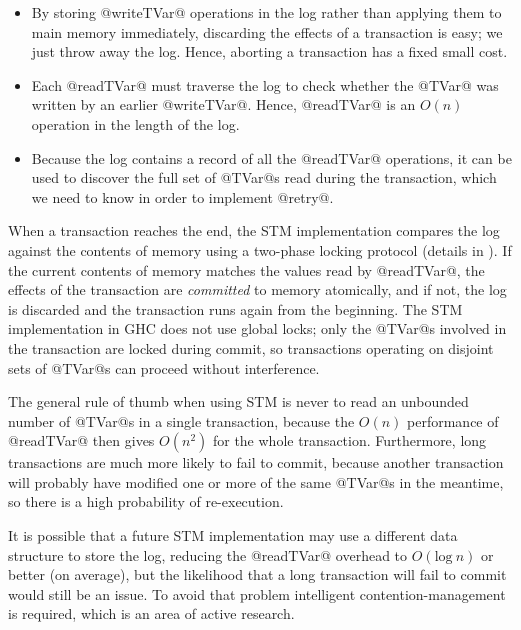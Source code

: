 \begin{itemize}
\item By storing @writeTVar@ operations in the log rather than
  applying them to main memory immediately, discarding the effects of
  a transaction is easy; we just throw away the log.  Hence, aborting
  a transaction has a fixed small cost.

\item Each @readTVar@ must traverse the log to check whether the
  @TVar@ was written by an earlier @writeTVar@.  Hence, @readTVar@ is
  an $O(n)$ operation in the length of the log.

\item Because the log contains a record of all the @readTVar@
  operations, it can be used to discover the full set of @TVar@s read
  during the transaction, which we need to know in order to implement
  @retry@.
\end{itemize}

When a transaction reaches the end, the STM implementation compares
the log against the contents of memory using a two-phase locking
protocol (details in \citet{stm}).  If the current contents of memory
matches the values read by @readTVar@, the effects of the transaction
are \emph{committed} to memory atomically, and if not, the log is
discarded and the transaction runs again from the beginning.  The STM
implementation in GHC does not use global locks; only the @TVar@s
involved in the transaction are locked during commit, so transactions
operating on disjoint sets of @TVar@s can proceed without
interference.

The general rule of thumb when using STM is never to read an unbounded
number of @TVar@s in a single transaction, because the $O(n)$
performance of @readTVar@ then gives $O(n^2)$ for the whole
transaction.  Furthermore, long transactions are much more likely to
fail to commit, because another transaction will probably have
modified one or more of the same @TVar@s in the meantime, so there is
a high probability of re-execution.

It is possible that a future STM implementation may use a different
data structure to store the log, reducing the @readTVar@ overhead to
$O(\mbox{log}~n)$ or better (on average), but the likelihood that a
long transaction will fail to commit would still be an issue.  To
avoid that problem intelligent contention-management is required,
which is an area of active research.


